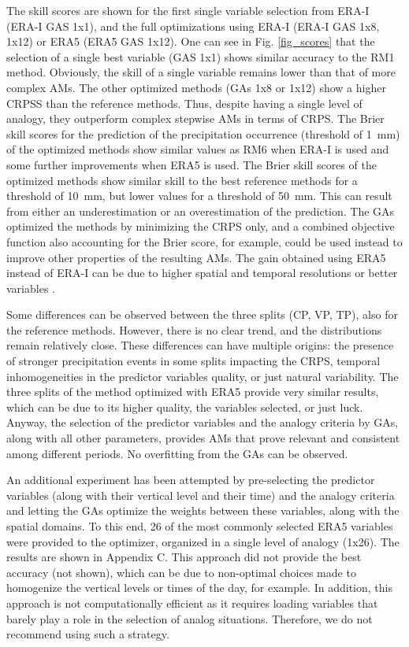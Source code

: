 \documentclass[draft]{agujournal2019}
\begin{document}
The skill scores are shown for the first single variable selection from ERA-I (ERA-I GAS 1x1), and the full optimizations using ERA-I (ERA-I GAS 1x8, 1x12) or ERA5 (ERA5 GAS 1x12). One can see in Fig. \ref{fig_scores} that the selection of a single best variable (GAS 1x1) shows similar accuracy to the RM1 method. Obviously, the skill of a single variable remains lower than that of more complex AMs. The other optimized methods (GAs 1x8 or 1x12) show a higher CRPSS than the reference methods. Thus, despite having a single level of analogy, they outperform complex stepwise AMs in terms of CRPS. The Brier skill scores for the prediction of the precipitation occurrence (threshold of 1~mm) of the optimized methods show similar values as RM6 when ERA-I is used and some further improvements when ERA5 is used. The Brier skill scores of the optimized methods show similar skill to the best reference methods for a threshold of 10~mm, but lower values for a threshold of 50~mm. This can result from either an underestimation or an overestimation of the prediction. The GAs optimized the methods by minimizing the CRPS only, and a combined objective function also accounting for the Brier score, for example, could be used instead to improve other properties of the resulting AMs. The gain obtained using ERA5 instead of ERA-I can be due to higher spatial and temporal resolutions or better variables \cite{Horton2021}. 

Some differences can be observed between the three splits (CP, VP, TP), also for the reference methods. However, there is no clear trend, and the distributions remain relatively close. These differences can have multiple origins: the presence of stronger precipitation events in some splits impacting the CRPS, temporal inhomogeneities in the predictor variables quality, or just natural variability. The three splits of the method optimized with ERA5 provide very similar results, which can be due to its higher quality, the variables selected, or just luck. Anyway, the selection of the predictor variables and the analogy criteria by GAs, along with all other parameters, provides AMs that prove relevant and consistent among different periods. No overfitting from the GAs can be observed.

An additional experiment has been attempted by pre-selecting the predictor variables (along with their vertical level and their time) and the analogy criteria and letting the GAs optimize the weights between these variables, along with the spatial domains. To this end, 26 of the most commonly selected ERA5 variables were provided to the optimizer, organized in a single level of analogy (1x26). The results are shown in Appendix C. This approach did not provide the best accuracy (not shown), which can be due to non-optimal choices made to homogenize the vertical levels or times of the day, for example. In addition, this approach is not computationally efficient as it requires loading variables that barely play a role in the selection of analog situations. Therefore, we do not recommend using such a strategy.
\end{document}

